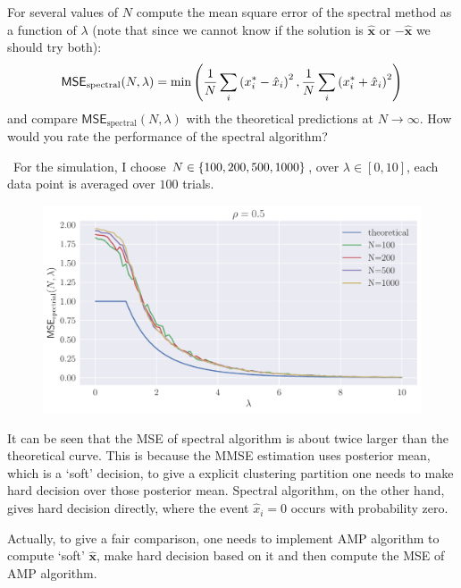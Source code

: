 \documentclass[a4paper,oneside,12pt]{article}
\begin{document}
For several values of $ N $ compute the mean square error of the spectral method as a function of $ \lambda $ (note that since we cannot know if the solution is $ \hat{\mathbf{x}} $ or $ -\hat{\mathbf{x}} $ we should try both):
\begin{equation*}
    \mathsf{MSE}_{\mathrm{spectral}}(N, \lambda)
    = \min \left(  \frac{1}{N} \sum_i \left(  x_i^* - \hat{x}_i  \right)^2, \frac{1}{N} \sum_i \left(  x_i^* + \hat{x}_i  \right)^2  \right)
\end{equation*}
and compare $ \mathsf{MSE}_{\mathrm{spectral}}(N, \lambda) $ with the theoretical predictions at $ N \to \infty $.
How would you rate the performance of the spectral algorithm?
\begin{solution} $\,$ 
For the simulation, I choose $ N \in \left\lbrace  100, 200, 500, 1000  \right\rbrace $, over $ \lambda \in [0, 10] $, each data point is averaged over $ 100 $ trials.
\begin{figure}[H]
    \centering
    \includegraphics[width=400pt]{hw4/hw4_2.pdf}
\end{figure}
It can be seen that the MSE of spectral algorithm is about twice larger than the theoretical curve.
This is because the MMSE estimation uses posterior mean, which is a `soft' decision, to give a explicit clustering partition one needs to make hard decision over those posterior mean.
Spectral algorithm, on the other hand, gives hard decision directly, where the event $ \hat{x}_i = 0 $ occurs with probability zero.

Actually, to give a fair comparison, one needs to implement AMP algorithm to compute `soft' $ \hat{\mathbf{x}} $, make hard decision based on it and then compute the MSE of AMP algorithm.
\end{solution}
\end{document}
